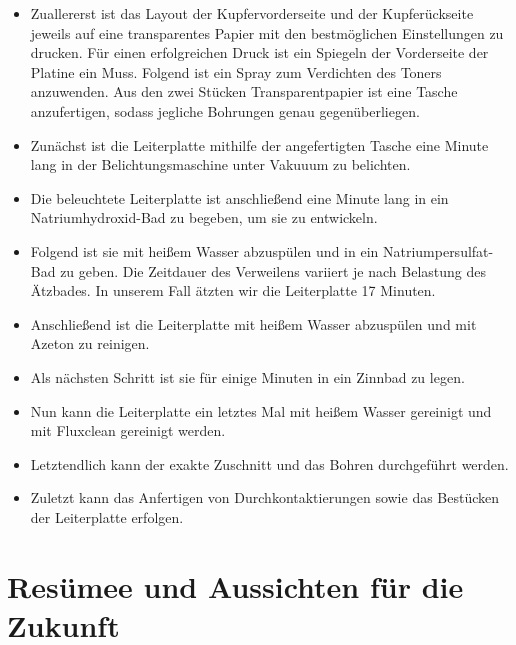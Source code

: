 \begin{itemize}
\item Zuallererst ist das Layout der Kupfervorderseite und der Kupferückseite jeweils auf eine transparentes Papier mit den bestmöglichen Einstellungen zu drucken.
Für einen erfolgreichen Druck ist ein Spiegeln der Vorderseite der Platine ein Muss.
Folgend ist ein Spray zum Verdichten des Toners anzuwenden.
Aus den zwei Stücken Transparentpapier ist eine Tasche anzufertigen, sodass jegliche Bohrungen genau gegenüberliegen. \\

\item Zunächst ist die Leiterplatte mithilfe der angefertigten Tasche eine Minute lang in der Belichtungsmaschine unter Vakuuum zu belichten. \\

\item Die beleuchtete Leiterplatte ist anschließend eine Minute lang in ein Natriumhydroxid-Bad zu begeben, um sie zu entwickeln. \\

\item Folgend ist sie mit heißem Wasser abzuspülen und in ein Natriumpersulfat-Bad zu geben.
Die Zeitdauer des Verweilens variiert je nach Belastung des Ätzbades.
In unserem Fall ätzten wir die Leiterplatte 17 Minuten. \\

\item Anschließend ist die Leiterplatte mit heißem Wasser abzuspülen und mit Azeton zu reinigen. \\

\item Als nächsten Schritt ist sie für einige Minuten in ein Zinnbad zu legen. \\

\item Nun kann die Leiterplatte ein letztes Mal mit heißem Wasser gereinigt und mit Fluxclean gereinigt werden.

\item Letztendlich kann der exakte Zuschnitt und das Bohren durchgeführt werden. \\

\item Zuletzt kann das Anfertigen von Durchkontaktierungen sowie das Bestücken der Leiterplatte erfolgen.
\end{itemize}



\newpage
\section{Resümee und Aussichten für die Zukunft}

